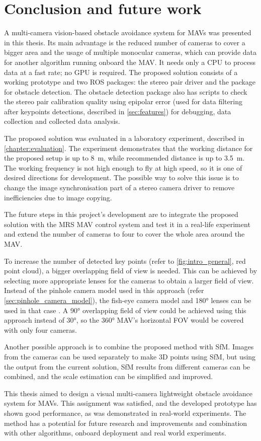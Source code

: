 \chapter{Conclusion and future work}
\label{chapter:conclusion}

A multi-camera vision-based obstacle avoidance system for MAVs was presented in this thesis. 
Its main advantage is the reduced number of cameras to cover a bigger area and the usage of multiple monocular cameras, which can provide data for another algorithm running onboard the MAV.
It needs only a CPU to process data at a fast rate; no GPU is required.
The proposed solution consists of a working prototype and two ROS packages: the stereo pair driver and the package for obstacle detection.
The obstacle detection package also has scripts to check the stereo pair calibration quality using epipolar error (used for data filtering after keypoints detections, described in \autoref{sec:features}) for debugging, data collection and collected data analysis.

The proposed solution was evaluated in a laboratory experiment, described in \autoref{chapter:evaluation}. 
The experiment demonstrates that the working distance for the proposed setup is up to \SI{8}{\meter}, while recommended distance is up to \SI{3.5}{\meter}. 
The working frequency is not high enough to fly at high speed, so it is one of desired directions for development.
The possible way to solve this issue is to change the image synchronisation part of a stereo camera driver to remove inefficiencies due to image copying.

The future steps in this project's development are to integrate the proposed solution with the MRS MAV control system and test it in a real-life experiment and extend the number of cameras to four to cover the whole area around the MAV.

To increase the number of detected key points (refer to \autoref{fig:intro_general}, red point cloud), a bigger overlapping field of view is needed.
This can be achieved by selecting more appropriate lenses for the cameras to obtain a larger field of view.
Instead of the pinhole camera model used in this approach (refer \autoref{sec:pinhole_camera_model}), the fish-eye camera model and \ang{180} lenses can be used in that case \cite{fish-eye}.
A \ang{90} overlapping field of view could be achieved using this approach instead of \ang{30}, so the \ang{360} MAV's horizontal FOV would be covered with only four cameras.

Another possible approach is to combine the proposed method with SfM.
Images from the cameras can be used separately to make 3D points using SfM, but using the output from the current solution, SfM results from different cameras can be combined, and the scale estimation can be simplified and improved.

This thesis aimed to design a visual multi-camera lightweight obstacle avoidance system for MAVs. 
This assignment was satisfied, and the developed prototype has shown good performance, as was demonstrated in real-world experiments.
The method has a potential for future research and improvements and combination with other algorithms, onboard deployment and real world experiments.